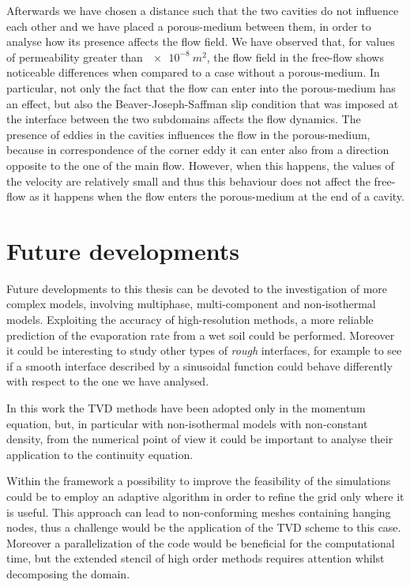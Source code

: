 Afterwards we have chosen a distance such that the two cavities do not 
influence each other and we have placed a porous-medium between them, in order 
to analyse how its presence affects the flow field. We have observed that, 
for values of permeability greater than $\SI{e-8}{m^2}$, the flow field in the 
free-flow shows noticeable differences when compared to a case without a 
porous-medium. In particular, not only the fact that the flow can enter into 
the porous-medium has an effect, but also the Beaver-Joseph-Saffman slip 
condition that was imposed at the interface between the two subdomains affects the flow dynamics. The 
presence of eddies in the cavities influences the flow in the 
porous-medium, because in correspondence of the corner eddy it can enter also 
from a direction opposite to the one of the main flow. However, when this 
happens, the values of the velocity are relatively small and thus this 
behaviour does not affect the free-flow as it happens when the flow enters the 
porous-medium at the end of a cavity.
%
\section{Future developments}
Future developments to this thesis can be devoted to the investigation of more 
complex models, involving multiphase, multi-component and non-isothermal 
models. Exploiting the accuracy of high-resolution methods, a more reliable 
prediction of the evaporation rate from a wet soil could be performed. Moreover it could be interesting to study other types of \emph{rough} interfaces, for example to see if a smooth interface described by a sinusoidal function could behave differently with respect to the one we have analysed.

In this work the TVD methods have been adopted only in the momentum equation, 
but, in particular with non-isothermal models with non-constant density, from 
the numerical point of view it could be important to analyse their 
application to the continuity equation.

Within the \DUMUX framework a possibility to improve the feasibility of the 
simulations could be to employ an adaptive algorithm in order to refine the grid 
only where it is useful. This approach can lead to non-conforming meshes 
containing hanging nodes, thus a challenge would be the application of the TVD 
scheme to this case. Moreover a parallelization of the code would be 
beneficial for the computational time, but the extended stencil of high order methods 
requires attention whilst decomposing the domain.